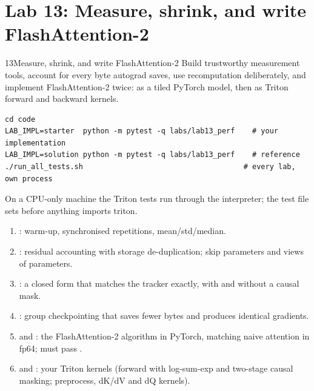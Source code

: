 \section{Lab 13: Measure, shrink, and write FlashAttention-2}\label{sec:perf:lab}
\begin{labbox}{13}{Measure, shrink, and write FlashAttention-2}
Build trustworthy measurement tools, account for every byte autograd saves, use recomputation
deliberately, and implement FlashAttention-2 twice: as a tiled PyTorch model, then as Triton
forward and backward kernels.

\begin{lstlisting}[style=shell]
cd code
LAB_IMPL=starter  python -m pytest -q labs/lab13_perf    # your implementation
LAB_IMPL=solution python -m pytest -q labs/lab13_perf    # reference
./run_all_tests.sh                                     # every lab, own process
\end{lstlisting}
On a CPU-only machine the Triton tests run through the interpreter; the test file sets
 before anything imports triton.

\begin{enumerate}
\item {}: warm-up, synchronised repetitions, mean/std/median.
\item {}: residual accounting with storage de-duplication; skip
  parameters and views of parameters.
\item {}: a closed form that matches the tracker exactly, with and
  without a causal mask.
\item {}: group checkpointing that saves fewer bytes and produces identical
  gradients.
\item {} and : the FlashAttention-2 algorithm in
  PyTorch, matching naive attention in fp64;  must pass
  .
\item {} and : your Triton kernels (forward with
  log-sum-exp and two-stage causal masking; preprocess, dK/dV and dQ kernels).
\end{enumerate}


\end{labbox}
